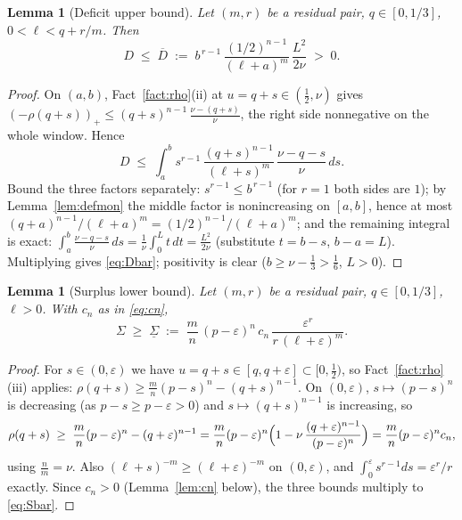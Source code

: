 \documentclass[11pt]{amsart}
\newtheorem{lemma}[theorem]{Lemma}
\theoremstyle{remark}
\begin{document}
\begin{lemma}[Deficit upper bound]\label{lem:deficit}
Let $(m,r)$ be a residual pair, $q\in[0,1/3]$, $0<\ell<q+r/m$.  Then
\begin{equation}\label{eq:Dbar}
        D\;\le\;\overline D
        \;:=\;
        b^{\,r-1}\,\frac{(1/2)^{n-1}}{(\ell+a)^{m}}\,\frac{L^{2}}{2\nu}
        \;>\;0.
\end{equation}
\end{lemma}

\begin{proof}
On $(a,b)$, Fact~\ref{fact:rho}(ii) at $u=q+s\in(\tfrac12,\nu)$ gives $(-\rho(q+s))_+\le(q+s)^{n-1}\,\frac{\nu-(q+s)}{\nu}$, the right side nonnegative on the whole window.  Hence
\[
        D\;\le\;\int_a^b s^{r-1}\,\frac{(q+s)^{n-1}}{(\ell+s)^{m}}\,
        \frac{\nu-q-s}{\nu}\,ds .
\]
Bound the three factors separately: $s^{r-1}\le b^{\,r-1}$ (for $r=1$ both sides are $1$); by Lemma~\ref{lem:defmon} the middle factor is nonincreasing on $[a,b]$, hence at most $(q+a)^{n-1}/(\ell+a)^{m}=(1/2)^{n-1}/(\ell+a)^{m}$; and the remaining integral is exact:
$\int_a^b\frac{\nu-q-s}{\nu}\,ds=\frac1\nu\int_0^{L}t\,dt=\frac{L^{2}}{2\nu}$ (substitute $t=b-s$, $b-a=L$).  Multiplying gives \eqref{eq:Dbar}; positivity is clear ($b\ge\nu-\tfrac13>\tfrac16$, $L>0$).
\end{proof}

\begin{lemma}[Surplus lower bound]\label{lem:surplus}
Let $(m,r)$ be a residual pair, $q\in[0,1/3]$, $\ell>0$.  With $c_n$ as in \eqref{eq:cn},
\begin{equation}\label{eq:Sbar}
        \Sigma\;\ge\;\underline\Sigma
        \;:=\;
        \frac mn\,(p-\varepsilon)^{n}\,c_n\,
        \frac{\varepsilon^{r}}{r\,(\ell+\varepsilon)^{m}} .
\end{equation}
\end{lemma}

\begin{proof}
For $s\in(0,\varepsilon)$ we have $u=q+s\in[q,q+\varepsilon]\subset[0,\tfrac12)$, so Fact~\ref{fact:rho}(iii) applies: $\rho(q+s)\ge\frac mn(p-s)^{n}-(q+s)^{n-1}$.  On $(0,\varepsilon)$, $s\mapsto(p-s)^n$ is decreasing (as $p-s\ge p-\varepsilon>0$) and $s\mapsto(q+s)^{n-1}$ is increasing, so
\[
        \rho(q+s)\;\ge\;\frac mn(p-\varepsilon)^{n}-(q+\varepsilon)^{n-1}
        =\frac mn(p-\varepsilon)^{n}
        \Bigl(1-\nu\,\frac{(q+\varepsilon)^{n-1}}{(p-\varepsilon)^{n}}\Bigr)
        =\frac mn(p-\varepsilon)^{n}c_n,
\]
using $\tfrac nm=\nu$.  Also $(\ell+s)^{-m}\ge(\ell+\varepsilon)^{-m}$ on $(0,\varepsilon)$, and $\int_0^{\varepsilon}s^{r-1}ds=\varepsilon^{r}/r$ exactly.  Since $c_n>0$ (Lemma~\ref{lem:cn} below), the three bounds multiply to \eqref{eq:Sbar}.
\end{proof}
\end{document}
